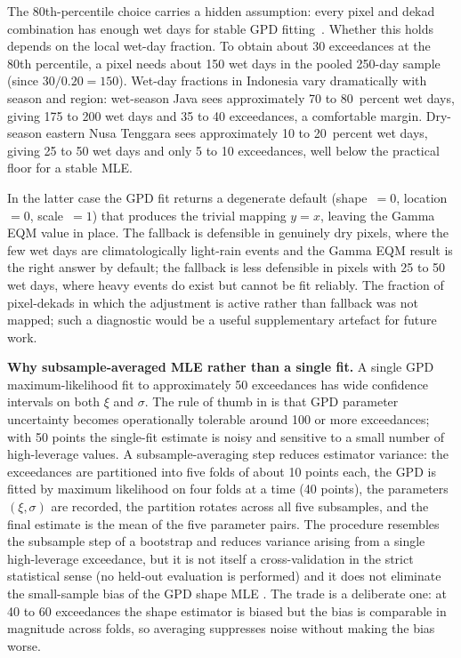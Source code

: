 The 80th-percentile choice carries a hidden assumption: every
pixel and dekad combination has enough wet days for stable GPD
fitting~\citep{ref:pickands1975}. Whether this holds depends on the local wet-day
fraction. To obtain about 30 exceedances at the 80th percentile,
a pixel needs about 150 wet days in the pooled 250-day sample
(since $30 / 0.20 = 150$). Wet-day fractions in Indonesia vary
dramatically with season and region: wet-season Java sees
approximately 70 to 80~percent wet days, giving 175 to 200 wet
days and 35 to 40 exceedances, a comfortable margin. Dry-season
eastern Nusa Tenggara sees approximately 10 to 20~percent wet
days, giving 25 to 50 wet days and only 5 to 10 exceedances,
well below the practical floor for a stable MLE.

In the latter case the GPD fit returns a degenerate default
(shape~$= 0$, location~$= 0$, scale~$= 1$) that produces the
trivial mapping $y = x$, leaving the Gamma EQM value in
place. The fallback is defensible in genuinely dry pixels, where
the few wet days are climatologically light-rain events and the
Gamma EQM result is the right answer by default; the fallback
is less defensible in pixels with 25 to 50 wet days, where heavy
events do exist but cannot be fit reliably. The fraction of
pixel-dekads in which the adjustment is active rather than
fallback was not mapped; such a diagnostic would be a useful
supplementary artefact for future work.

\medskip\noindent\textbf{Why subsample-averaged MLE rather than a single fit.}
A single GPD maximum-likelihood fit to approximately 50
exceedances has wide confidence intervals on both $\xi$ and
$\sigma$. The rule of thumb in \citep{ref:coles2001} is that GPD
parameter uncertainty becomes operationally tolerable around 100
or more exceedances; with 50 points the single-fit estimate is
noisy and sensitive to a small number of high-leverage values.
A subsample-averaging step reduces estimator variance: the
exceedances are partitioned into five folds of about 10 points
each, the GPD is fitted by maximum likelihood on four folds at a
time (40 points), the parameters $(\xi, \sigma)$ are recorded,
the partition rotates across all five subsamples, and the final
estimate is the mean of the five parameter pairs. The procedure
resembles the subsample step of a bootstrap and reduces variance
arising from a single high-leverage exceedance, but it is not
itself a cross-validation in the strict statistical sense (no
held-out evaluation is performed) and it does not eliminate the
small-sample bias of the GPD shape MLE \citep{ref:hoskingwallis1987}.
The trade is a deliberate one: at 40 to 60 exceedances the
shape estimator is biased but the bias is comparable in
magnitude across folds, so averaging suppresses noise without
making the bias worse.

